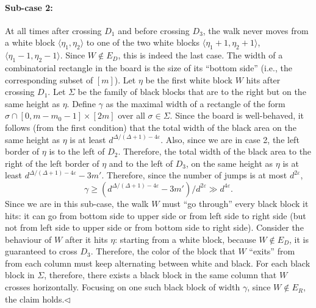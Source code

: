 \paragraph{Sub-case 2:} At all times after crossing $D_1$ and before crossing $D_3$, the walk never moves from a white block $\langle\eta_1,\eta_2\rangle$ to one of the two white blocks $\langle\eta_1+1,\eta_2+1\rangle$, $\langle\eta_1-1,\eta_2-1\rangle$. Since $W\notin E_D$, this is indeed the last case. The width of a combinatorial rectangle in the board is the size of its ``bottom side'' (i.e., the corresponding subset of $[m]$). Let $\eta$ be the first white block $W$ hits after crossing $D_1$. Let $\Sigma$ be the family of black blocks that are to the right but on the same height as $\eta$. Define $\gamma$ as the maximal width of a rectangle of the form $\sigma\cap[0,m-m_0-1]\times[2m]$ over all $\sigma\in\Sigma$. Since the board is well-behaved, it follows (from the first condition) that the total width of the black area on the same height as $\eta$ is at least $d^{\Delta/(\Delta+1)-4\varepsilon}$. Also, since we are in case 2, the left border of $\eta$ is to the left of $D_2$. Therefore, the total width of the black area to the right of the left border of $\eta$ and to the left of $D_3$, on the same height as $\eta$ is at least $d^{\Delta/(\Delta+1)-4\varepsilon}-3m'$. Therefore, since the number of jumps is at most $d^{2\varepsilon}$,
\[\gamma\geq(d^{\Delta/(\Delta+1)-4\varepsilon}-3m')/d^{2\varepsilon}\gg d^{4\varepsilon}.\]
Since we are in this sub-case, the walk $W$ must ``go through'' every black block it hits: it can go from bottom side to upper side or from left side to right side (but not from left side to upper side or from bottom side to right side). Consider the behaviour of $W$ after it hits $\eta$: starting from a white block, because $W\notin E_D$, it is guaranteed to cross $D_3$. Therefore, the color of the block that $W$ ``exits'' from from each column must keep alternating between white and black. For each black block in $\Sigma$, therefore, there exists a black block in the same column that $W$ crosses horizontally. Focusing on one such black block of width $\gamma$, since $W\notin E_R$, the claim holds.\hfill$\triangleleft$
